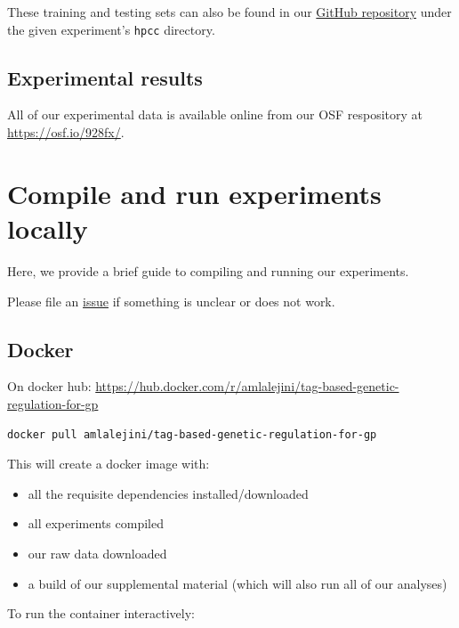 \documentclass[
]{book}
\providecommand{\tightlist}{%
  \setlength{\itemsep}{0pt}\setlength{\parskip}{0pt}}
\begin{document}
These training and testing sets can also be found in our \href{https://github.com/amlalejini/Tag-based-Genetic-Regulation-for-LinearGP}{GitHub repository} under the given experiment's \texttt{hpcc} directory.

\hypertarget{experimental-results}{%
\section{Experimental results}\label{experimental-results}}

All of our experimental data is available online from our OSF respository \citep{Lalejini_Moreno_Ofria_Data_2020} at \url{https://osf.io/928fx/}.

\hypertarget{compile-and-run-experiments-locally}{%
\chapter{Compile and run experiments locally}\label{compile-and-run-experiments-locally}}

Here, we provide a brief guide to compiling and running our experiments.

Please file an \href{https://github.com/amlalejini/Tag-based-Genetic-Regulation-for-LinearGP/issues}{issue} if something is unclear or does not work.

\hypertarget{docker}{%
\section{Docker}\label{docker}}

On docker hub: \url{https://hub.docker.com/r/amlalejini/tag-based-genetic-regulation-for-gp}

\begin{verbatim}
docker pull amlalejini/tag-based-genetic-regulation-for-gp
\end{verbatim}

This will create a docker image with:

\begin{itemize}
\tightlist
\item
  all the requisite dependencies installed/downloaded
\item
  all experiments compiled
\item
  our raw data downloaded
\item
  a build of our supplemental material (which will also run all of our analyses)
\end{itemize}

To run the container interactively:
\end{document}
